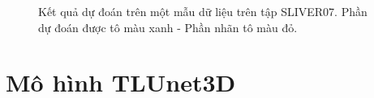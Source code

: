 \begin{figure}
  \centering
  \caption{Kết quả dự đoán trên một mẫu dữ liệu trên tập SLIVER07. Phần dự đoán được tô màu xanh - Phần nhãn tô màu đỏ.}
  \label{fig:seg_SLIVER07}
\end{figure}

\section{Mô hình TLUnet3D}
